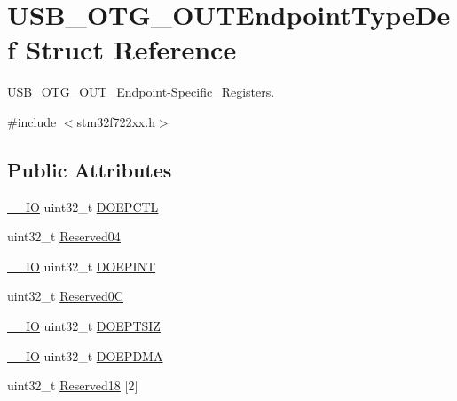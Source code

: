 \hypertarget{struct_u_s_b___o_t_g___o_u_t_endpoint_type_def}{}\section{U\+S\+B\+\_\+\+O\+T\+G\+\_\+\+O\+U\+T\+Endpoint\+Type\+Def Struct Reference}
\label{struct_u_s_b___o_t_g___o_u_t_endpoint_type_def}


U\+S\+B\+\_\+\+O\+T\+G\+\_\+\+O\+U\+T\+\_\+\+Endpoint-\/\+Specific\+\_\+\+Registers.  




{\ttfamily \#include $<$stm32f722xx.\+h$>$}

\subsection*{Public Attributes}
\begin{DoxyCompactItemize}
\item 
\mbox{\hyperlink{core__sc300_8h_aec43007d9998a0a0e01faede4133d6be}{\+\_\+\+\_\+\+IO}} uint32\+\_\+t \mbox{\hyperlink{struct_u_s_b___o_t_g___o_u_t_endpoint_type_def_a86a62895d4b90531c30f5a48f404ddea}{D\+O\+E\+P\+C\+TL}}
\item 
uint32\+\_\+t \mbox{\hyperlink{struct_u_s_b___o_t_g___o_u_t_endpoint_type_def_a76533e00218c269a8064cf68c3daf7e9}{Reserved04}}
\item 
\mbox{\hyperlink{core__sc300_8h_aec43007d9998a0a0e01faede4133d6be}{\+\_\+\+\_\+\+IO}} uint32\+\_\+t \mbox{\hyperlink{struct_u_s_b___o_t_g___o_u_t_endpoint_type_def_a0b8b826828cba51585aabe9b73074d07}{D\+O\+E\+P\+I\+NT}}
\item 
uint32\+\_\+t \mbox{\hyperlink{struct_u_s_b___o_t_g___o_u_t_endpoint_type_def_a1d7bc9b546c4dd8ce2fe792945cf7a9d}{Reserved0C}}
\item 
\mbox{\hyperlink{core__sc300_8h_aec43007d9998a0a0e01faede4133d6be}{\+\_\+\+\_\+\+IO}} uint32\+\_\+t \mbox{\hyperlink{struct_u_s_b___o_t_g___o_u_t_endpoint_type_def_a5e4876bb58a4a01eacf675b69f36df26}{D\+O\+E\+P\+T\+S\+IZ}}
\item 
\mbox{\hyperlink{core__sc300_8h_aec43007d9998a0a0e01faede4133d6be}{\+\_\+\+\_\+\+IO}} uint32\+\_\+t \mbox{\hyperlink{struct_u_s_b___o_t_g___o_u_t_endpoint_type_def_a189d59fa4e34c96ce7eb25c0afd50cd7}{D\+O\+E\+P\+D\+MA}}
\item 
uint32\+\_\+t \mbox{\hyperlink{struct_u_s_b___o_t_g___o_u_t_endpoint_type_def_a51b162457add1bb7cc254b7aeb9f94bd}{Reserved18}} \mbox{[}2\mbox{]}
\end{DoxyCompactItemize}


